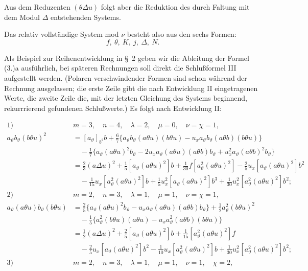 \documentclass[11pt]{article}
\newcommand{\A}{\Delta}
\begin{document}
Aus dem Reduzenten $(\theta\A u)$ folgt aber die Reduktion des durch Faltung mit dem Modul $\A$ entstehenden Systems.

\bigskip


Das relativ vollständige System mod $\nu$ besteht also aus den sechs Formen:
\[
f,\ \theta,\ K,\ j,\ \A,\ N.
\]

Als Beispiel zur Reihenentwicklung in \S\ 2 geben wir die Ableitung der Formel (3.)a ausführlich, bei späteren Rechnungen soll direkt die Schlußformel III aufgestellt werden. (Polaren verschwindender Formen sind schon während der Rechnung ausgelassen; die erste Zeile gibt die nach Entwicklung II eingetragenen Werte, die zweite Zeile die, mit der letzten Gleichung des Systems beginnend, rekurrrierend gefundenen Schlußwerte.) Es folgt nach Entwicklung II:


\begin{align*}
\text{1)}\quad&m=3,\quad n=4,\quad \lambda=2,\quad \mu=0,\quad \nu=\chi=1,\\
a_\vartheta b_\vartheta(b\theta u)^2
&=[a_\vartheta]_{b^2}b+\frac67\{a_\vartheta b_\vartheta(a\theta u)(b\theta u)-u_xa_\vartheta b_\vartheta(a\theta b)(b\theta u)\}\\
&\quad-\frac17\{a_\vartheta(a\theta u)^2b_\vartheta-2u_xa_\vartheta(a\theta u)(a\theta b)b_\vartheta+u_x^2a_\vartheta(a\theta b)^2b_\vartheta\}\\
&=\frac23(a\Delta u)^2+\frac15[a_\vartheta(a\theta u)^2]b+\frac1{30}f[a_\vartheta^2(a\theta u)^2]-\frac25u_x[a_\vartheta(a\theta u)^2]b^2\\
&\quad-\frac1{15}u_x[a_\vartheta^2(a\theta u)^2]b+\frac15u_x^2[a_\vartheta(a\theta u)^2]b^3+\frac1{30}u_x^2[a_\vartheta^2(a\theta u)^2]b^2;\\[.6em]
\text{2)}\quad&m=2,\quad n=3,\quad \lambda=1,\quad \mu=1,\quad \nu=\chi=1,\\
a_\vartheta(a\theta u)b_\vartheta(b\theta u)
&=\frac25\{a_\vartheta(a\theta u)^2b_\vartheta-u_xa_\vartheta(a\theta u)(a\theta b)b_\vartheta\}+\frac12a_\vartheta^2(b\theta u)^2\\
&\quad-\frac15\{a_\vartheta^2(b\theta u)(a\theta u)-u_xa_\vartheta^2(a\theta b)(b\theta u)\}\\
&=\frac12(a\Delta u)^2+\frac25[a_\vartheta(a\theta u)^2]b+\frac1{15}[a_\vartheta^2(a\theta u)^2]f\\
&\quad-\frac25u_x[a_\vartheta(a\theta u)^2]b^2-\frac1{10}u_x[a_\vartheta^2(a\theta u)^2]b+\frac1{30}u_x^2[a_\vartheta^2(a\theta u)^2]b^2;\\[.6em]
\text{3)}\quad&m=2,\quad n=3,\quad \lambda=1,\quad \mu=1,\quad \nu=1,\quad \chi=2,\\

\end{align*}
\end{document}
